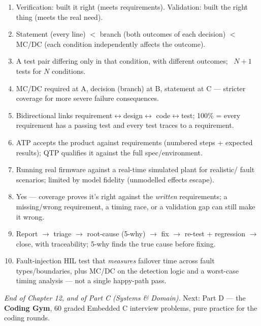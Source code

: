 \begin{answerkey}
\begin{enumerate}
\item Verification: built it right (meets requirements). Validation: built the
  right thing (meets the real need).
\item Statement (every line) $<$ branch (both outcomes of each decision) $<$
  MC/DC (each condition independently affects the outcome).
\item A test pair differing only in that condition, with different outcomes;
  ~$N+1$ tests for $N$ conditions.
\item MC/DC required at A, decision (branch) at B, statement at C --- stricter
  coverage for more severe failure consequences.
\item Bidirectional links requirement$\leftrightarrow$design$\leftrightarrow$
  code$\leftrightarrow$test; 100\% = every requirement has a passing test and
  every test traces to a requirement.
\item ATP accepts the product against requirements (numbered steps + expected
  results); QTP qualifies it against the full spec/environment.
\item Running real firmware against a real-time simulated plant for realistic/
  fault scenarios; limited by model fidelity (unmodelled effects escape).
\item Yes --- coverage proves it's right against the \emph{written} requirements;
  a missing/wrong requirement, a timing race, or a validation gap can still make
  it wrong.
\item Report $\rightarrow$ triage $\rightarrow$ root-cause (5-why) $\rightarrow$
  fix $\rightarrow$ re-test + regression $\rightarrow$ close, with traceability;
  5-why finds the true cause before fixing.
\item Fault-injection HIL test that \emph{measures} failover time across fault
  types/boundaries, plus MC/DC on the detection logic and a worst-case timing
  analysis --- not a single happy-path pass.
\end{enumerate}
\end{answerkey}

\begin{partnote}
\emph{End of Chapter 12, and of Part C (Systems \& Domain).} Next: Part D ---
the \textbf{Coding Gym}, 60 graded Embedded C interview problems, pure practice
for the coding rounds.
\end{partnote}
